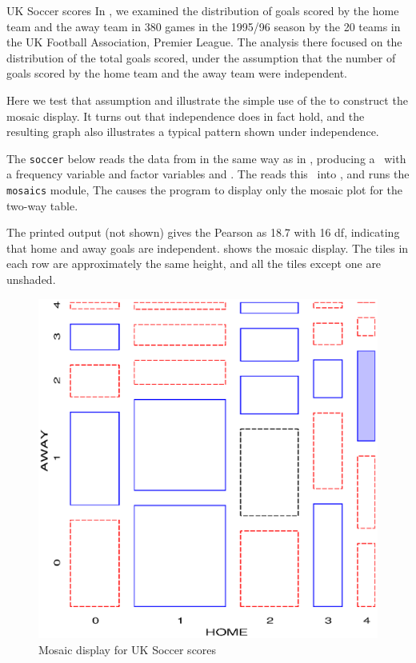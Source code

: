 \begin{Example}[soccer2]{UK Soccer scores}
In , we examined the distribution of goals scored
by the home team and the away team in 380 games in the 1995/96 season
by the 20 teams in the UK Football Association, Premier League.
The analysis there focused on the distribution of the total goals
scored, under the assumption that the number of goals scored by
the home team and the away team were independent.

Here we test that assumption and illustrate the simple use of the
 to construct the mosaic display.
It turns out that independence does in fact hold, and the
resulting graph also illustrates a typical pattern
shown under independence.

The \Dstp{} \texttt{soccer} below reads the data from 
in the same way as in , producing a \Dset\
with a frequency variable  and factor variables
 and .
The  reads this \Dset\ into \IML{}, and runs
the \texttt{mosaics} module,
The  causes the program to display only the
mosaic plot for the two-way table.



The printed output (not shown) gives the Pearson \chisq{} as
18.7 with 16 df, indicating that home and away goals are independent.
\figref{fig:soccer2} shows the mosaic display.
The tiles in each row are approximately
the same height, and all the tiles except one are unshaded.
\begin{figure}[htb]
  \centering
  \includegraphics[scale=.6]{ch4/fig/soccer2}
  \caption[Mosaic display for UK Soccer scores]{Mosaic display for UK Soccer scores}  \label{fig:soccer2}
\end{figure}


\end{Example}

